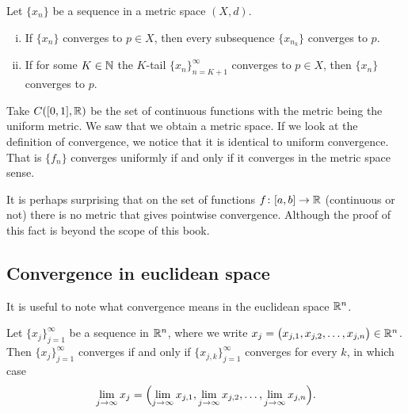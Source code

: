 \begin{prop} \label{prop:mssubseq}
Let $\{ x_n \}$ be a sequence in a metric space $(X,d)$.
\begin{enumerate}[(i)]
\item If $\{ x_n \}$ converges to $p \in X$, then every subsequence $\{ x_{n_k} \}$
converges to $p$.
\item If for some $K \in {\mathbb{N}}$ the $K$-tail $\{ x_n \}_{n=K+1}^\infty$
converges to $p \in X$, then
 $\{ x_n \}$ converges to $p$.
\end{enumerate}
\end{prop}

\begin{example}
Take $C([0,1],{\mathbb{R}})$ be the set of continuous functions with the metric being
the uniform metric.  We saw that we obtain a metric space.
If we look at the definition of convergence, we notice that it is identical
to uniform convergence.  That is $\{ f_n \}$ converges uniformly if and only
if it converges in the metric space sense.
\end{example}

\begin{remark}
It is perhaps surprising that on the set of functions $f \colon [a,b] \to
{\mathbb{R}}$ (continuous or not)
there is no metric that gives pointwise convergence.  Although the proof of
this fact is beyond the scope of this book.
\end{remark}

\subsection{Convergence in euclidean space}

It is useful to note what convergence means in the euclidean space
${\mathbb{R}}^n$.

\begin{prop} \label{prop:msconveuc}
Let $\{ x_j \}_{j=1}^\infty$ be a sequence in ${\mathbb{R}}^n$,
where we write $x_j = \bigl(x_{j,1},x_{j,2},\ldots,x_{j,n}\bigr) \in {\mathbb{R}}^n$.
Then $\{ x_j \}_{j=1}^\infty$ converges if and only if
$\{ x_{j,k} \}_{j=1}^\infty$ converges for every $k$, in which case
\begin{equation*}
\lim_{j\to\infty}
x_j =
\Bigl(
\lim_{j\to\infty} x_{j,1},
\lim_{j\to\infty} x_{j,2},
\ldots,
\lim_{j\to\infty} x_{j,n}
\Bigr) .
\end{equation*}
\end{prop}

